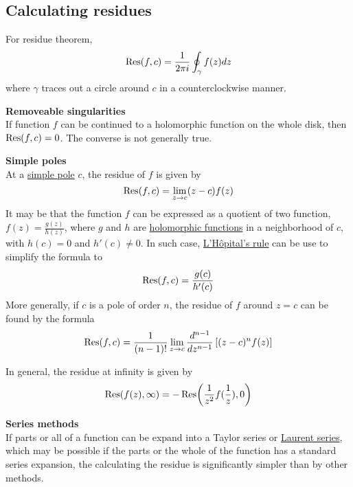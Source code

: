 \subsection{Calculating residues}
For residue theorem,
\begin{equation*}
  \Res(f,c) = \frac{1}{2\pi i} \oint_\gamma f(z) dz
\end{equation*}
where $\gamma$ traces out a circle around $c$ in a counterclockwise manner.

\textbf{Removeable singularities}\\
If function $f$ can be continued to a holomorphic function on the whole disk, then $\Res(f,c)=0$.
The converse is not generally true.

\textbf{Simple poles}\\
At a \href{https://en.wikipedia.org/wiki/Zeros_and_poles}{simple pole} $c$, the residue of $f$ is given by
\begin{equation*}
  \Res(f,c) = \lim_{z\to c}(z-c)f(z)
\end{equation*}
It may be that the function $f$ can be expressed as a quotient of two function, $f(z)=\frac{g(z)}{h(z)}$, where $g$ and $h$ are \href{https://en.wikipedia.org/wiki/Holomorphic_function}{holomorphic functions} in a neighborhood of $c$, with $h(c)=0$ and $h'(c)\neq 0$.
  In such case, \href{https://en.wikipedia.org/wiki/L%27H%C3%B4pital%27s_rule}{L'H\^{o}pital's rule} can be use to simplify the formula to
\begin{equation*}
  \Res(f,c)= \frac{g(c)}{h'(c)}
\end{equation*}
More generally, if $c$ is a pole of order $n$, the residue of $f$ around $z=c$ can be found by the formula
\begin{equation*}
  \Res(f,c)=\frac{1}{(n-1)!} \lim_{z\to c} \frac{d^{n-1}}{dz^{n-1}} \left[(z-c)^n f(z) \right]
\end{equation*}

In general, the residue at infinity is given by
\begin{equation*}
  \Res(f(z),\infty) = - \Res(\frac{1}{z^2}f(\frac{1}{z}),0)
\end{equation*}

\textbf{Series methods}\\
If parts or all of a function can be expand into a Taylor series or \href{https://en.wikipedia.org/wiki/Laurent_series}{Laurent series}, which may be possible if the parts or the whole of the function has a standard series expansion, the calculating the residue is significantly simpler than by other methods.


